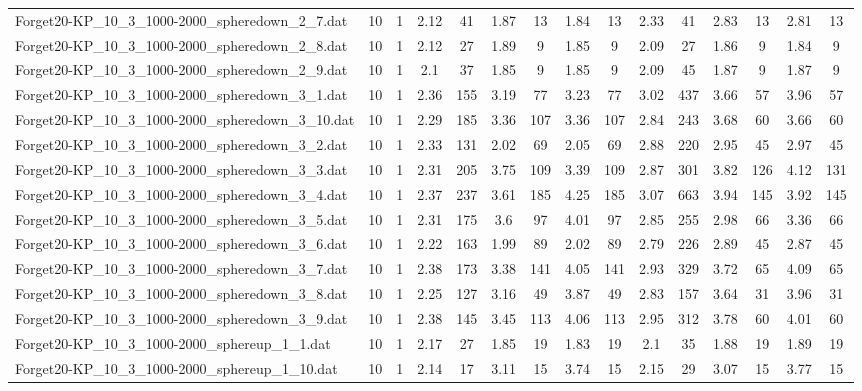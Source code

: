 \begin{table}[!ht]
{\begin{tabular}{lcccccccccccccc}
Forget20-KP\_10\_3\_1000-2000\_spheredown\_2\_7.dat & 10 & 1 & 2.12 & 41 & 1.87 & 13 & 1.84 & 13 & 2.33 & 41 & 2.83 & 13 & 2.81 & 13 \\
Forget20-KP\_10\_3\_1000-2000\_spheredown\_2\_8.dat & 10 & 1 & 2.12 & 27 & 1.89 & 9 & 1.85 & 9 & 2.09 & 27 & 1.86 & 9 & 1.84 & 9 \\
Forget20-KP\_10\_3\_1000-2000\_spheredown\_2\_9.dat & 10 & 1 & 2.1 & 37 & 1.85 & 9 & 1.85 & 9 & 2.09 & 45 & 1.87 & 9 & 1.87 & 9 \\
Forget20-KP\_10\_3\_1000-2000\_spheredown\_3\_1.dat & 10 & 1 & 2.36 & 155 & 3.19 & 77 & 3.23 & 77 & 3.02 & 437 & 3.66 & 57 & 3.96 & 57 \\
Forget20-KP\_10\_3\_1000-2000\_spheredown\_3\_10.dat & 10 & 1 & 2.29 & 185 & 3.36 & 107 & 3.36 & 107 & 2.84 & 243 & 3.68 & 60 & 3.66 & 60 \\
Forget20-KP\_10\_3\_1000-2000\_spheredown\_3\_2.dat & 10 & 1 & 2.33 & 131 & 2.02 & 69 & 2.05 & 69 & 2.88 & 220 & 2.95 & 45 & 2.97 & 45 \\
Forget20-KP\_10\_3\_1000-2000\_spheredown\_3\_3.dat & 10 & 1 & 2.31 & 205 & 3.75 & 109 & 3.39 & 109 & 2.87 & 301 & 3.82 & 126 & 4.12 & 131 \\
Forget20-KP\_10\_3\_1000-2000\_spheredown\_3\_4.dat & 10 & 1 & 2.37 & 237 & 3.61 & 185 & 4.25 & 185 & 3.07 & 663 & 3.94 & 145 & 3.92 & 145 \\
Forget20-KP\_10\_3\_1000-2000\_spheredown\_3\_5.dat & 10 & 1 & 2.31 & 175 & 3.6 & 97 & 4.01 & 97 & 2.85 & 255 & 2.98 & 66 & 3.36 & 66 \\
Forget20-KP\_10\_3\_1000-2000\_spheredown\_3\_6.dat & 10 & 1 & 2.22 & 163 & 1.99 & 89 & 2.02 & 89 & 2.79 & 226 & 2.89 & 45 & 2.87 & 45 \\
Forget20-KP\_10\_3\_1000-2000\_spheredown\_3\_7.dat & 10 & 1 & 2.38 & 173 & 3.38 & 141 & 4.05 & 141 & 2.93 & 329 & 3.72 & 65 & 4.09 & 65 \\
Forget20-KP\_10\_3\_1000-2000\_spheredown\_3\_8.dat & 10 & 1 & 2.25 & 127 & 3.16 & 49 & 3.87 & 49 & 2.83 & 157 & 3.64 & 31 & 3.96 & 31 \\
Forget20-KP\_10\_3\_1000-2000\_spheredown\_3\_9.dat & 10 & 1 & 2.38 & 145 & 3.45 & 113 & 4.06 & 113 & 2.95 & 312 & 3.78 & 60 & 4.01 & 60 \\
Forget20-KP\_10\_3\_1000-2000\_sphereup\_1\_1.dat & 10 & 1 & 2.17 & 27 & 1.85 & 19 & 1.83 & 19 & 2.1 & 35 & 1.88 & 19 & 1.89 & 19 \\
Forget20-KP\_10\_3\_1000-2000\_sphereup\_1\_10.dat & 10 & 1 & 2.14 & 17 & 3.11 & 15 & 3.74 & 15 & 2.15 & 29 & 3.07 & 15 & 3.77 & 15 \\

\end{tabular}}
\end{table}
